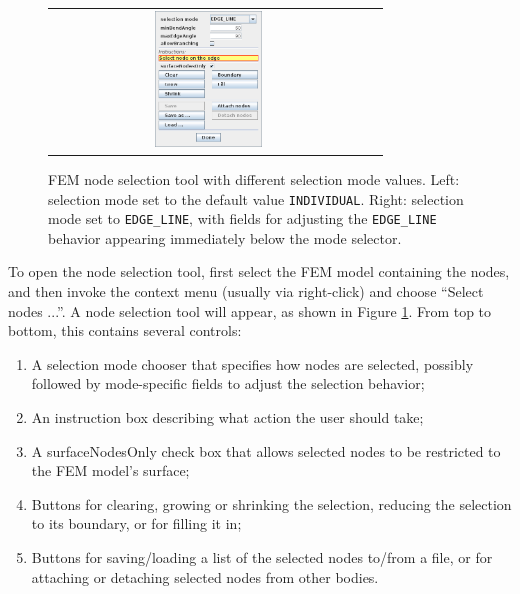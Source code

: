 \documentclass{article}
\begin{document}
\begin{figure}[ht]
\begin{center}
\begin{tabular}{cc}
   \includegraphics[width=0.35\textwidth]{images/nodeSelectToolEdge}
\fi
\end{tabular}
\end{center}
\caption{FEM node selection tool with different selection mode values.
Left: selection mode set to the default value {\tt INDIVIDUAL}. Right:
selection mode set to {\tt EDGE\_LINE}, with fields for adjusting the
{\tt EDGE\_LINE} behavior appearing immediately below the mode
selector.}
\label{nodeSelection:fig}
\end{figure}

To open the node selection tool, first select the FEM model containing
the nodes, and then invoke the context menu (usually via right-click)
and choose ``{\sf Select nodes ...}''. A node selection tool will
appear, as shown in Figure \ref{nodeSelection:fig}. From top to
bottom, this contains several controls:

\begin{enumerate}

\item A {\sf selection mode} chooser that specifies how nodes are
selected, possibly followed by mode-specific fields to adjust the
selection behavior;

\item An instruction box describing what action the user should take;

\item A {\sf surfaceNodesOnly} check box that allows selected nodes to
be restricted to the FEM model's surface;

\item Buttons for clearing, growing or shrinking the selection,
reducing the selection to its boundary, or for filling it in;

\item Buttons for saving/loading a list of the selected nodes to/from
a file, or for attaching or detaching selected nodes from other
bodies.

\end{enumerate}
\end{document}
